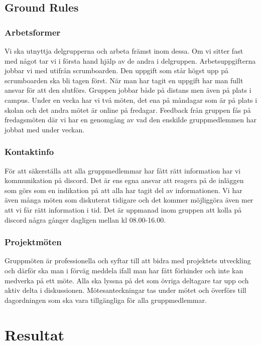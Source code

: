 \documentclass{article}
\begin{document}
\subsection{Ground Rules}

\subsubsection{Arbetsformer}

Vi ska utnyttja delgrupperna och arbeta främst inom dessa. Om vi sitter fast med något tar
vi i första hand hjälp av de andra i delgruppen. Arbetsuppgifterna jobbar vi med utifrån
scrumboarden. Den uppgift som står högst upp på scrumboarden ska bli tagen först. När man har tagit en uppgift har man fullt ansvar för
att den slutförs. Gruppen jobbar både på distans men även på plats i campus. Under en
vecka har vi två möten, det ena på måndagar som är på plats i skolan och det andra mötet är
online på fredagar. Feedback från gruppen fås på fredagsmöten där vi har en genomgång av
vad den enskilde gruppmedlemmen har jobbat med under veckan.

\subsubsection{Kontaktinfo}

För att säkerställa att alla gruppmedlemmar har fått rätt information har vi kommunikation på
discord. Det är ens egna ansvar att reagera på de inläggen som görs som en indikation på att
alla har tagit del av informationen. Vi har även många möten som diskuterat tidigare och det
kommer möjliggöra även mer att vi får rätt information i tid. Det är uppmanad inom gruppen
att kolla på discord några gånger dagligen mellan kl 08.00-16.00.

\subsubsection{Projektmöten}

Gruppmöten är professionella och syftar till att bidra med projektets utveckling och därför
ska man i förväg meddela ifall man har fått förhinder och inte kan medverka på ett möte. Alla
ska lyssna på det som övriga deltagare tar upp och aktiv delta i diskussionen.
Mötesanteckningar tas under mötet och överförs till dagordningen som ska vara tillgängliga
för alla gruppmedlemmar.
\section{Resultat}
\end{document}
